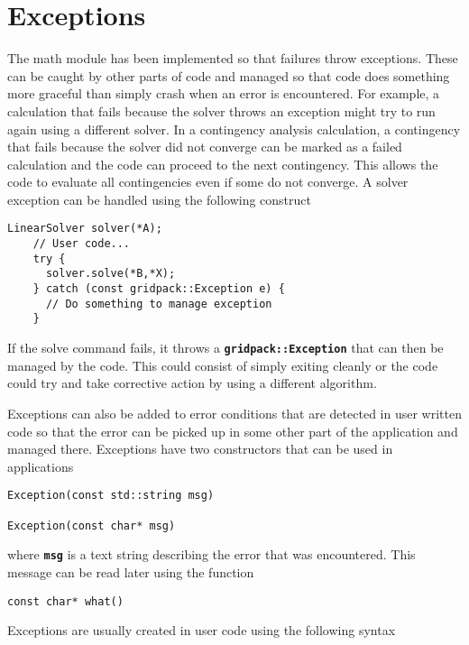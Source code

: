 \section{Exceptions}

The math module has been implemented so that failures throw exceptions. These can be caught by other parts of code and managed so that code does something more graceful than simply crash when an error is encountered. For example, a calculation that fails because the solver throws an exception might try to run again using a different solver. In a contingency analysis calculation, a contingency that fails because the solver did not converge can be marked as a failed calculation and the code can proceed to the next contingency. This allows the code to evaluate all contingencies even if some do not converge. A solver exception can be handled using the following construct

{
\color{red}
\begin{Verbatim}[fontseries=b]
    LinearSolver solver(*A);
    // User code...
    try {
      solver.solve(*B,*X);
    } catch (const gridpack::Exception e) {
      // Do something to manage exception
    }
\end{Verbatim}
}

If the solve command fails, it throws a \texttt{\textbf{gridpack::Exception}} that can then be managed by the code. This could consist of simply exiting cleanly or the code could try and take corrective action by using a different algorithm.

Exceptions can also be added to error conditions that are detected in user written code so that the error can be picked up in some other part of the application and managed there. Exceptions have two constructors that can be used in applications

{
\color{red}
\begin{Verbatim}[fontseries=b]
Exception(const std::string msg)

Exception(const char* msg)
\end{Verbatim}
}

where \texttt{\textbf{msg}} is a text string describing the error that was encountered. This message can be read later using the function

{
\color{red}
\begin{Verbatim}[fontseries=b]
const char* what()
\end{Verbatim}
}

Exceptions are usually created in user code using the following syntax

